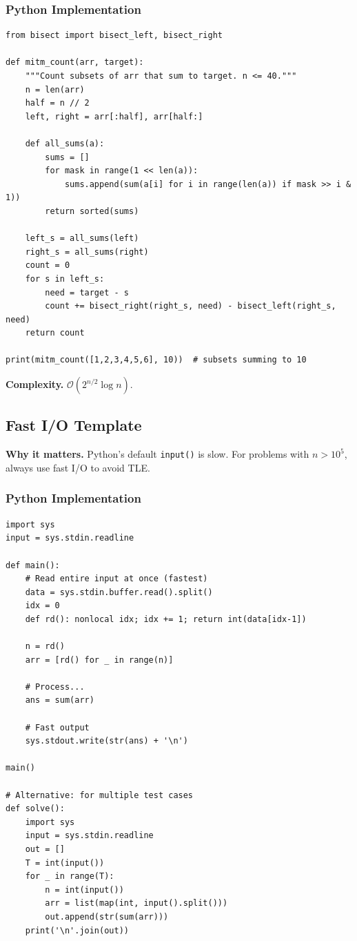 \documentclass[10pt,a4paper]{article}
\theoremstyle{cpstyle}
\newcommand{\bigO}[1]{\mathcal{O}\!\left(#1\right)}
\begin{document}
\subsubsection{Python Implementation}
\begin{lstlisting}[caption={Meet-in-the-Middle -- count subsets summing to target}]
from bisect import bisect_left, bisect_right

def mitm_count(arr, target):
    """Count subsets of arr that sum to target. n <= 40."""
    n = len(arr)
    half = n // 2
    left, right = arr[:half], arr[half:]

    def all_sums(a):
        sums = []
        for mask in range(1 << len(a)):
            sums.append(sum(a[i] for i in range(len(a)) if mask >> i & 1))
        return sorted(sums)

    left_s = all_sums(left)
    right_s = all_sums(right)
    count = 0
    for s in left_s:
        need = target - s
        count += bisect_right(right_s, need) - bisect_left(right_s, need)
    return count

print(mitm_count([1,2,3,4,5,6], 10))  # subsets summing to 10
\end{lstlisting}

\textbf{Complexity.} $\bigO{2^{n/2} \log n}$.

\subsection{Fast I/O Template}

\textbf{Why it matters.} Python's default \texttt{input()} is slow. For problems with $n > 10^5$, always use fast I/O to avoid TLE.

\subsubsection{Python Implementation}
\begin{lstlisting}[caption={Fast I/O template for competitive programming}]
import sys
input = sys.stdin.readline

def main():
    # Read entire input at once (fastest)
    data = sys.stdin.buffer.read().split()
    idx = 0
    def rd(): nonlocal idx; idx += 1; return int(data[idx-1])

    n = rd()
    arr = [rd() for _ in range(n)]

    # Process...
    ans = sum(arr)

    # Fast output
    sys.stdout.write(str(ans) + '\n')

main()

# Alternative: for multiple test cases
def solve():
    import sys
    input = sys.stdin.readline
    out = []
    T = int(input())
    for _ in range(T):
        n = int(input())
        arr = list(map(int, input().split()))
        out.append(str(sum(arr)))
    print('\n'.join(out))
\end{lstlisting}
\end{document}
